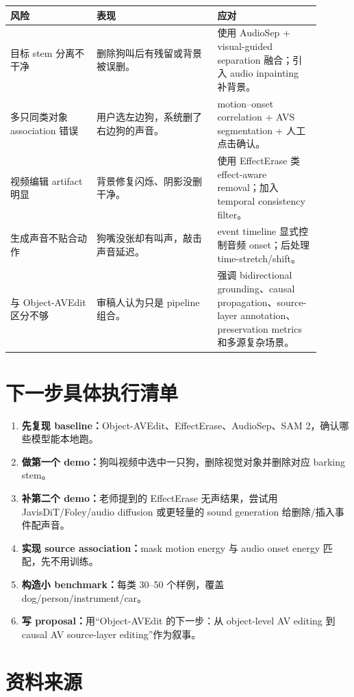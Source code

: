 \begin{longtable}{p{0.25\linewidth}p{0.35\linewidth}p{0.30\linewidth}}
\toprule
\textbf{风险} & \textbf{表现} & \textbf{应对} \\
\midrule
目标 stem 分离不干净 & 删除狗叫后有残留或背景被误删。 & 使用 AudioSep + visual-guided separation 融合；引入 audio inpainting 补背景。 \\
\midrule
多只同类对象 association 错误 & 用户选左边狗，系统删了右边狗的声音。 & motion--onset correlation + AVS segmentation + 人工点击确认。 \\
\midrule
视频编辑 artifact 明显 & 背景修复闪烁、阴影没删干净。 & 使用 EffectErase 类 effect-aware removal；加入 temporal consistency filter。 \\
\midrule
生成声音不贴合动作 & 狗嘴没张却有叫声，敲击声音延迟。 & event timeline 显式控制音频 onset；后处理 time-stretch/shift。 \\
\midrule
与 Object-AVEdit 区分不够 & 审稿人认为只是 pipeline 组合。 & 强调 bidirectional grounding、causal propagation、source-layer annotation、preservation metrics 和多源复杂场景。 \\
\bottomrule
\end{longtable}

\section{下一步具体执行清单}

\begin{enumerate}[leftmargin=2em]
  \item \textbf{先复现 baseline：}Object-AVEdit、EffectErase、AudioSep、SAM 2，确认哪些模型能本地跑。
  \item \textbf{做第一个 demo：}狗叫视频中选中一只狗，删除视觉对象并删除对应 barking stem。
  \item \textbf{补第二个 demo：}老师提到的 EffectErase 无声结果，尝试用 JavisDiT/Foley/audio diffusion 或更轻量的 sound generation 给删除/插入事件配声音。
  \item \textbf{实现 source association：}mask motion energy 与 audio onset energy 匹配，先不用训练。
  \item \textbf{构造小 benchmark：}每类 30--50 个样例，覆盖 dog/person/instrument/car。
  \item \textbf{写 proposal：}用“Object-AVEdit 的下一步：从 object-level AV editing 到 causal AV source-layer editing”作为叙事。
\end{enumerate}

\section{资料来源}

